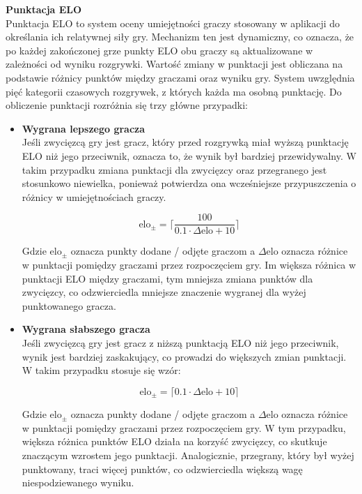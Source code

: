 \documentclass[12pt,a4paper]{article}
\begin{document}
\newpage

\noindent \textbf{Punktacja ELO}\\
Punktacja ELO to system oceny umiejętności graczy stosowany w aplikacji do określania ich relatywnej siły gry. Mechanizm ten jest dynamiczny, co oznacza, że po każdej zakończonej grze punkty ELO obu graczy są aktualizowane w zależności od wyniku rozgrywki. Wartość zmiany w punktacji jest obliczana na podstawie różnicy punktów między graczami oraz wyniku gry. System uwzględnia pięć kategorii czasowych rozgrywek, z których każda ma osobną punktację. Do obliczenie punktacji rozróżnia się trzy główne przypadki:

\begin{itemize}
    \item \textbf{Wygrana lepszego gracza}\\
    Jeśli zwycięzcą gry jest gracz, który przed rozgrywką miał wyższą punktację ELO niż jego przeciwnik, oznacza to, że wynik był bardziej przewidywalny. W takim przypadku zmiana punktacji dla zwycięzcy oraz przegranego jest stosunkowo niewielka, ponieważ potwierdza ona wcześniejsze przypuszczenia o różnicy w umiejętnościach graczy.

    \[ \text{elo}_{\pm} = \lceil \frac{100}{0.1 \cdot \Delta \text{elo} + 10} \rceil \]

    Gdzie $ \text{elo}_{\pm} $ oznacza punkty dodane / odjęte graczom a $ \Delta \text{elo} $ oznacza różnice w punktacji pomiędzy graczami przez rozpoczęciem gry. Im większa różnica w punktacji ELO między graczami, tym mniejsza zmiana punktów dla zwycięzcy, co odzwierciedla mniejsze znaczenie wygranej dla wyżej punktowanego gracza.
    \item \textbf{Wygrana słabszego gracza}\\
    Jeśli zwycięzcą gry jest gracz z niższą punktacją ELO niż jego przeciwnik, wynik jest bardziej zaskakujący, co prowadzi do większych zmian punktacji. W takim przypadku stosuje się wzór:

    \[ \text{elo}_{\pm} = \lceil 0.1 \cdot \Delta \text{elo} + 10 \rceil \]

    Gdzie $ \text{elo}_{\pm} $ oznacza punkty dodane / odjęte graczom a $ \Delta \text{elo} $ oznacza różnice w punktacji pomiędzy graczami przez rozpoczęciem gry. W tym przypadku, większa różnica punktów ELO działa na korzyść zwycięzcy, co skutkuje znaczącym wzrostem jego punktacji. Analogicznie, przegrany, który był wyżej punktowany, traci więcej punktów, co odzwierciedla większą wagę niespodziewanego wyniku.


\end{itemize}
\end{document}
